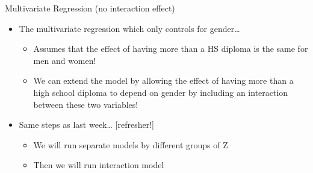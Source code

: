 \documentclass[8pt,ignorenonframetext,dvipsnames]{beamer}
\providecommand{\tightlist}{%
  \setlength{\itemsep}{0pt}\setlength{\parskip}{0pt}}
\let\olditem\item
\renewcommand{\item}{%
  \olditem\vspace{4pt}
}
\begin{document}
\begin{frame}{Multivariate Regression (no interaction effect)}
\protect\hypertarget{multivariate-regression-no-interaction-effect-1}{}

\begin{itemize}
\tightlist
\item
  The multivariate regression which only controls for gender\ldots{}

  \begin{itemize}
  \tightlist
  \item
    Assumes that the effect of having more than a HS diploma is the same
    for men and women!
  \item
    We can extend the model by allowing the effect of having more than a
    high school diploma to depend on gender by including an interaction
    between these two variables!
  \end{itemize}
\item
  Same steps as last week\ldots{} {[}refresher!{]}

  \begin{itemize}
  \tightlist
  \item
    We will run separate models by different groups of Z
  \item
    Then we will run interaction model
  \end{itemize}
\end{itemize}

\end{frame}
\end{document}
